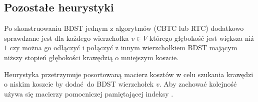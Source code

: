 \subsection{Pozostałe heurystyki}
Po skonstruowaniu BDST jednym z algorytmów (CBTC lub RTC) dodatkowo sprawdzane jest dla każdego wierzchołka $v \in V$ którego głębokość jest większa niż $1$ czy można go odłączyć i połączyć z innym wierzchołkiem BDST mającym niższy stopień głębokości krawędzią o mniejszym koszcie.

Heurystyka przetrzymuje posortowaną macierz kosztów w celu szukania krawędzi o niskim koszcie by dodać do BDST wierzchołek $v$. Aby zachować kolejność używa się macierzy pomocniczej pamiętającej indeksy \cite{DBLP:journals/soco/SinghG07}.
